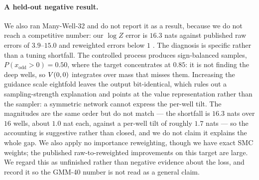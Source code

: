 \paragraph{A held-out negative result.}
We also ran Many-Well-32 \citep{midgley2021fab} and do not report it as a
result, because we do not reach a competitive number: our $\log Z$ error is
$16.3$ nats against published raw errors of $3.9$--$15.0$ and reweighted errors
below $1$ \citep{sendera2024offpolicy}. The diagnosis is specific rather than a
tuning shortfall. The controlled process produces sign-balanced samples,
$P(x_{\mathrm{odd}}>0)=0.50$, where the target concentrates at $0.85$: it is not
finding the deep wells, so $V(0,0)$ integrates over mass that misses them.
Increasing the guidance scale eightfold leaves the output bit-identical, which
rules out a sampling-strength explanation and points at the value
representation rather than the sampler: a symmetric network cannot express the
per-well tilt. The magnitudes are the same order but do not match --- the
shortfall is $16.3$ nats over $16$ wells, about $1.0$ nat each, against a
per-well tilt of roughly $1.7$ nats --- so the accounting is suggestive rather
than closed, and we do not claim it explains the whole gap. We
also apply no importance reweighting, though we have exact SMC weights; the
published raw-to-reweighted improvements on this target are large. We regard
this as unfinished rather than negative evidence about the loss, and record it
so the GMM-40 number is not read as a general claim.

